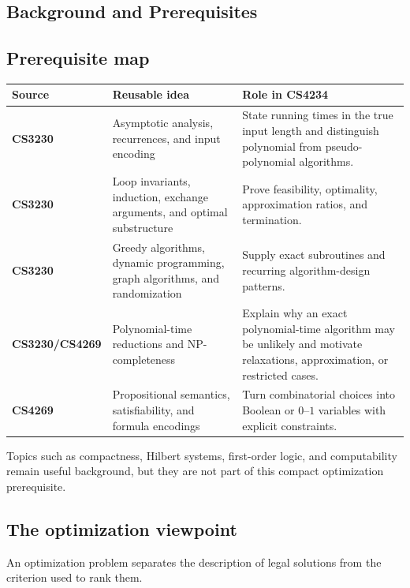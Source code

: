 \documentclass[10pt]{article}
\theoremstyle{definition}
\begin{document}
\begin{multicols*}{2}
\clearpage

\section{Background and Prerequisites}\label{app:background}
\subsection{Prerequisite map}

\begin{center}
\begin{tabular}{>{\bfseries}P{0.16\textwidth}P{0.34\textwidth}P{0.40\textwidth}}
\toprule
Source & Reusable idea & Role in CS4234 \\
\midrule
CS3230
& Asymptotic analysis, recurrences, and input encoding
& State running times in the true input length and distinguish polynomial
  from pseudo-polynomial algorithms. \\
CS3230
& Loop invariants, induction, exchange arguments, and optimal substructure
& Prove feasibility, optimality, approximation ratios, and termination. \\
CS3230
& Greedy algorithms, dynamic programming, graph algorithms, and randomization
& Supply exact subroutines and recurring algorithm-design patterns. \\
CS3230/\newline CS4269
& Polynomial-time reductions and NP-completeness
& Explain why an exact polynomial-time algorithm may be unlikely and motivate
  relaxations, approximation, or restricted cases. \\
CS4269
& Propositional semantics, satisfiability, and formula encodings
& Turn combinatorial choices into Boolean or $0$--$1$ variables with explicit
  constraints. \\
\bottomrule
\end{tabular}
\end{center}

Topics such as compactness, Hilbert systems, first-order logic, and
computability remain useful background, but they are not part of this compact
optimization prerequisite.

\subsection{The optimization viewpoint}

An optimization problem separates the description of legal solutions from the
criterion used to rank them.


\end{multicols*}
\end{document}
